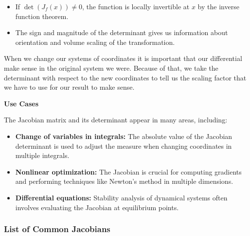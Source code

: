\begin{itemize}

    \item If \(\det(J_{f}(x)) \neq 0\), the function is locally invertible at \(x\) by the inverse 
      function theorem.
  
      \item The sign and magnitude of the determinant 
      gives us information about orientation and volume scaling of the transformation.

\end{itemize}

When we change our systems of coordinates it is important
that our differential make sense in the original system we were.
Because of that, we take the determinant with respect to the new
coordinates to tell us the scaling factor that we have to use for our
result to make sense.
\vspace{\baselineskip}

\textbf{Use Cases}
\vspace{\baselineskip}

The Jacobian matrix and its determinant appear in many areas, including:

\begin{itemize}
  
    \item \textbf{Change of variables in integrals:} The absolute value of the Jacobian determinant is used to adjust the measure when changing coordinates in multiple integrals.
  
    \item \textbf{Nonlinear optimization:} The Jacobian is crucial for computing gradients and performing techniques like Newton's method in multiple dimensions.
  
    \item \textbf{Differential equations:} Stability analysis of dynamical systems often involves evaluating the Jacobian at equilibrium points.

\end{itemize}

\subsubsection{List of Common Jacobians}

